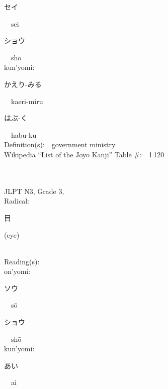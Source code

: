 \begin{multicols}{2}
{\hspace*{2em}}{\begin{CJK}{UTF8}{min} セイ \end{CJK}}\ \ sei\ \ \\
{\hspace*{2em}}{\begin{CJK}{UTF8}{min} ショウ \end{CJK}}\ \ sh\=o\ \ \\
{\hspace*{1em}}kun'yomi:\ \ \\
{\hspace*{2em}}{\begin{CJK}{UTF8}{min} かえり-みる \end{CJK}}\ \ kaeri-miru\ \ \\
{\hspace*{2em}}{\begin{CJK}{UTF8}{min} はぶ-く \end{CJK}}\ \ habu-ku\ \ \\
Definition(s):\ \ government ministry \\
Wikipedia ``List of the J\=oy\=o Kanji'' Table \#:\ \ 1\,120 \\
\ \ \\
{\fontsize{34pt}{40pt}  }\ \ \\  %
{JLPT N3, Grade 3, \\Radical:\ \ {\begin{CJK}{UTF8}{min} 目 \end{CJK}} (eye) } \\
Reading(s):\ \ \\
{\hspace*{1em}}on'yomi:\ \ \\
{\hspace*{2em}}{\begin{CJK}{UTF8}{min} ソウ \end{CJK}}\ \ s\=o\ \ \\
{\hspace*{2em}}{\begin{CJK}{UTF8}{min} ショウ \end{CJK}}\ \ sh\=o\ \ \\
{\hspace*{1em}}kun'yomi:\ \ \\
{\hspace*{2em}}{\begin{CJK}{UTF8}{min} あい \end{CJK}}\ \ ai\ \ \\

\end{multicols}

